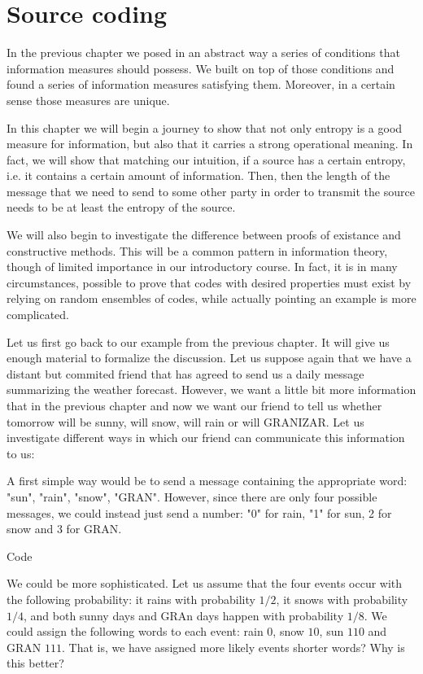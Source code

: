 \chapter{Source coding}
In the previous chapter we posed in an abstract way a series of conditions that information measures should possess. We built on top of those conditions and found a series of information measures satisfying them. Moreover, in a certain sense those measures are unique.

In this chapter we will begin a journey to show that not only entropy is a good measure for information, but also that it carries a strong operational meaning. In fact, we will show that matching  our intuition, if a source has a certain entropy, i.e. it contains a certain amount of information. Then, then the length of the message that we need to send to some other party in order to transmit the source needs to be at least the entropy of the source. 

We will also begin to investigate the difference between proofs of existance and constructive methods. This will be a common pattern in information theory, though of limited importance in our introductory course. In fact, it is in many circumstances, possible to prove that codes with desired properties must exist by relying on random ensembles of codes, while actually pointing an example is more complicated.

Let us first go back to our example from the previous chapter. It will give us enough material to formalize the discussion. Let us suppose again that we have a distant but commited friend that has agreed to send us a daily message summarizing the weather forecast. However, we want a little bit more information that in the previous chapter and now we want our friend to tell us whether tomorrow will be sunny, will snow, will rain or will GRANIZAR. Let us investigate different ways in which our friend can communicate this information to us:

A first simple way would be to send a message containing the appropriate word: "sun", "rain", "snow", "GRAN". However, since there are only four possible messages, we could instead just send a number: "0" for rain, "1" for sun, 2 for snow and 3 for GRAN. 

\begin{definition}
Code
\end{definition}
We could be more sophisticated. Let us assume that the four events occur with the following probability: it rains with probability $1/2$, it snows with probability $1/4$, and both sunny days and GRAn days happen with probability $1/8$. We could assign the following words to each event: rain $0$, snow $10$, sun $110$ and GRAN $111$. That is, we have assigned more likely events shorter words? Why is this better?

